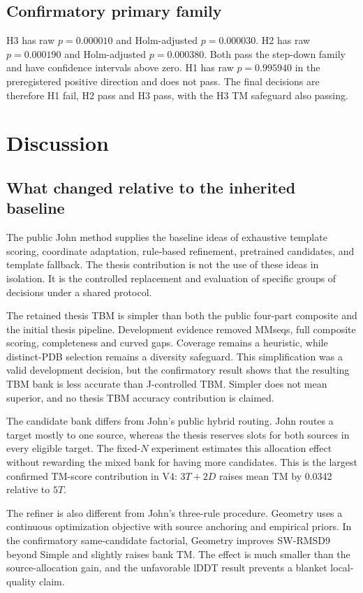 \documentclass[12pt,a4paper,oneside]{report}
\begin{document}
\section{Confirmatory primary family}

H3 has raw $p=0.000010$ and Holm-adjusted $p=0.000030$. H2 has raw
$p=0.000190$ and Holm-adjusted $p=0.000380$. Both pass the step-down family and have
confidence intervals above zero. H1 has raw $p=0.995940$ in the preregistered positive
direction and does not pass. The final decisions are therefore H1 fail, H2 pass and H3
pass, with the H3 TM safeguard also passing.

\chapter{Discussion}

\section{What changed relative to the inherited baseline}

The public John method supplies the baseline ideas of exhaustive template scoring,
coordinate adaptation, rule-based refinement, pretrained candidates, and template
fallback. The thesis contribution is not the use of these ideas in isolation. It is
the controlled replacement and evaluation of specific groups of decisions under a
shared protocol.

The retained thesis TBM is simpler than both the public four-part composite and the
initial thesis pipeline. Development evidence removed MMseqs, full composite scoring,
completeness and curved gaps. Coverage remains a heuristic, while distinct-PDB
selection remains a diversity safeguard. This simplification was a valid development
decision, but the confirmatory result shows that the resulting TBM bank is less
accurate than J-controlled TBM. Simpler does not mean superior, and no thesis TBM
accuracy contribution is claimed.

The candidate bank differs from John's public hybrid routing. John routes a target
mostly to one source, whereas the thesis reserves slots for both sources in every
eligible target. The fixed-$N$ experiment estimates this allocation effect without
rewarding the mixed bank for having more candidates. This is the largest confirmed
TM-score contribution in V4: $3T+2D$ raises mean TM by 0.0342 relative to $5T$.

The refiner is also different from John's three-rule procedure. Geometry uses a
continuous optimization objective with source anchoring and empirical priors. In the
confirmatory same-candidate factorial, Geometry improves SW-RMSD9 beyond Simple and
slightly raises bank TM. The effect is much smaller than the source-allocation gain,
and the unfavorable lDDT result prevents a blanket local-quality claim.
\end{document}
